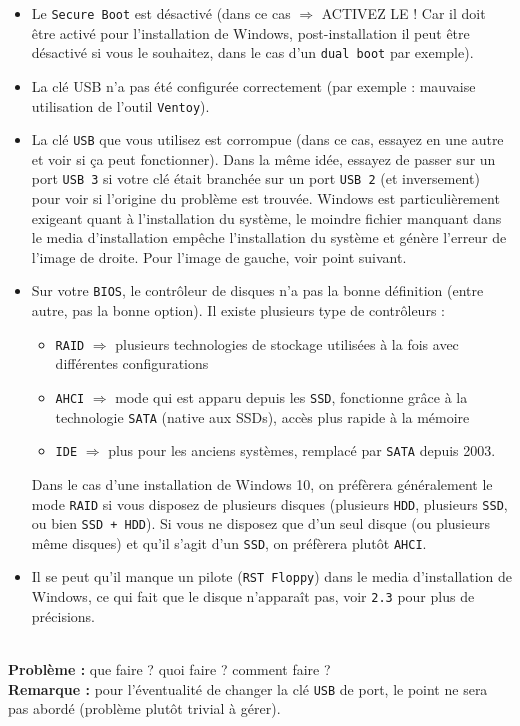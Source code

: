 \documentclass[french, a4paper, 11pt]{article}
\begin{document}
\begin{itemize}
\item Le \texttt{Secure Boot} est désactivé (dans ce cas $\Rightarrow$ ACTIVEZ LE ! Car il doit être activé pour l'installation de Windows, post-installation il peut être désactivé si vous le souhaitez, dans le cas d'un \texttt{dual boot} par exemple).
\item La clé USB n'a pas été configurée correctement (par exemple : mauvaise utilisation de l'outil \texttt{Ventoy}).
\item La clé \texttt{USB} que vous utilisez est corrompue (dans ce cas, essayez en une autre et voir si ça peut fonctionner). Dans la même idée, essayez de passer sur un port \texttt{USB 3} si votre clé était branchée sur un port \texttt{USB 2} (et inversement) pour voir si l'origine du problème est trouvée. Windows est particulièrement exigeant quant à l'installation du système, le moindre fichier manquant dans le media d'installation empêche l'installation du système et génère l'erreur de l'image de droite. Pour l'image de gauche, voir point suivant. 
\item Sur votre \texttt{BIOS}, le contrôleur de disques n'a pas la bonne définition (entre autre, pas la bonne option). Il existe plusieurs type de contrôleurs : \begin{itemize}
\item \texttt{RAID} $\Rightarrow$ plusieurs technologies de stockage utilisées à la fois avec différentes configurations
\item \texttt{AHCI} $\Rightarrow$ mode qui est apparu depuis les \texttt{SSD}, fonctionne grâce à la technologie \texttt{SATA} (native aux SSDs), accès plus rapide à la mémoire
\item \texttt{IDE} $\Rightarrow$ plus pour les anciens systèmes, remplacé par \texttt{SATA} depuis 2003. 	
\end{itemize}
Dans le cas d'une installation de Windows 10, on préfèrera généralement le mode \texttt{RAID} si vous disposez de plusieurs disques (plusieurs \texttt{HDD}, plusieurs \texttt{SSD}, ou bien \texttt{SSD + HDD}). Si vous ne disposez que d'un seul disque (ou plusieurs même disques) et qu'il s'agit d'un \texttt{SSD}, on préfèrera plutôt \texttt{AHCI}.
\item Il se peut qu'il manque un pilote (\texttt{RST Floppy}) dans le media d'installation de Windows, ce qui fait que le disque n'apparaît pas, voir \texttt{2.3} pour plus de précisions.
\end{itemize}
$ $\\ \noindent \textbf{Problème :} que faire ? quoi faire ? comment faire ? \\
\noindent \textbf{Remarque :} pour l'éventualité de changer la clé \texttt{USB} de port, le point ne sera pas abordé (problème plutôt trivial à gérer).\\
\end{document}
